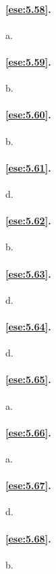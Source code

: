 \paragraph{\ref{ese:5.58}.}
a.

\paragraph{\ref{ese:5.59}.}
b.

\paragraph{\ref{ese:5.60}.}
b.

\paragraph{\ref{ese:5.61}.}
d.

\paragraph{\ref{ese:5.62}.}
b.

\paragraph{\ref{ese:5.63}.}
d.

\paragraph{\ref{ese:5.64}.}
d.

\paragraph{\ref{ese:5.65}.}
a.

\paragraph{\ref{ese:5.66}.}
a.

\paragraph{\ref{ese:5.67}.}
d.

\paragraph{\ref{ese:5.68}.}
b.

\endgroup
